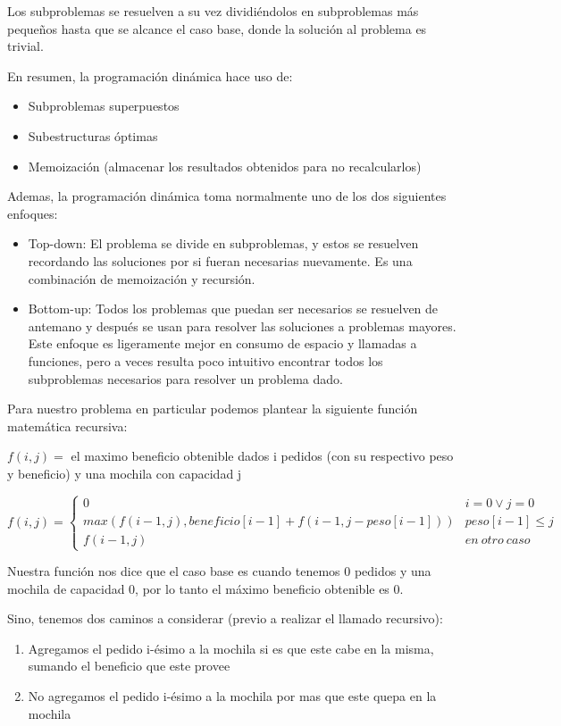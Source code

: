 Los subproblemas se resuelven a su vez dividiéndolos en subproblemas más pequeños hasta que se alcance el caso base, donde la solución al problema es trivial.


En resumen, la programación dinámica hace uso de:
\begin{itemize}
	\item Subproblemas superpuestos
	\item Subestructuras óptimas
	\item Memoización (almacenar los resultados obtenidos para no recalcularlos)
\end{itemize}


Ademas, la programación dinámica toma normalmente uno de los dos siguientes enfoques:
\begin{itemize}
	\item Top-down: El problema se divide en subproblemas, y estos se resuelven recordando las soluciones por si fueran necesarias nuevamente. Es una combinación de memoización y recursión.
	\item Bottom-up: Todos los problemas que puedan ser necesarios se resuelven de antemano y después se usan para resolver las soluciones a problemas mayores. Este enfoque es ligeramente mejor en consumo de espacio y llamadas a funciones, pero a veces resulta poco intuitivo encontrar todos los subproblemas necesarios para resolver un problema dado.
\end{itemize}


Para nuestro problema en particular podemos plantear la siguiente función matemática recursiva:


$f(i,j) =$ el maximo beneficio obtenible dados i pedidos (con su respectivo peso y beneficio) y una mochila con capacidad j


\begin{equation*}
	f(i,j) = \begin{cases} 
          0 & i = 0 \lor j = 0 \\
          max(f(i-1,j), beneficio[i-1] + f(i-1, j-peso[i-1])) & peso[i-1] \leq j \\
          f(i-1, j) & en\ otro\ caso
       \end{cases}
\end{equation*}

Nuestra función nos dice que el caso base es cuando tenemos 0 pedidos y una mochila de capacidad 0, por lo tanto el máximo beneficio obtenible es 0.

Sino, tenemos dos caminos a considerar (previo a realizar el llamado recursivo):
\begin{enumerate}
	\item Agregamos el pedido i-ésimo a la mochila si es que este cabe en la misma, sumando el beneficio que este provee
	\item No agregamos el pedido i-ésimo a la mochila por mas que este quepa en la mochila
\end{enumerate}


